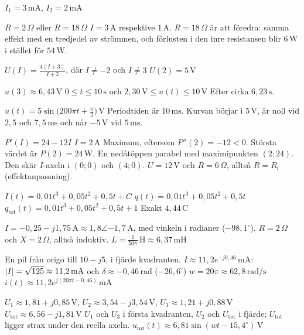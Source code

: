 
\begin{facit}

 $I_1 = 3\,\text{mA}$, $I_2 = 2\,\text{mA}$

  $R = 2\,\Omega$ eller $R = 18\,\Omega$
 $I = 3\,\text{A}$ respektive $1\,\text{A}$. $R = 18\,\Omega$ är att föredra: samma effekt
med en tredjedel av strömmen, och förlusten i den inre resistansen blir $6\,\text{W}$ i stället
för $54\,\text{W}$.

  $U(I) = \frac{4(I + 3)}{I + 2}$, där $I \neq -2$ och $I \neq 3$
 $U(2) = 5\,\text{V}$

  $u(3) \approx 6{,}43\,\text{V}$
 $0 \leq t \leq 10\,\text{s}$ och $2{,}30\,\text{V} \leq u(t) \leq 10\,\text{V}$
 Efter cirka $6{,}23\,\text{s}$.

  $u(t) = 5\sin\bigl(200\pi t + \frac{\pi}{2}\bigr)\,\text{V}$
 Periodtiden är $10\,\text{ms}$. Kurvan börjar i $5\,\text{V}$, är noll vid $2{,}5$ och
$7{,}5\,\text{ms}$ och når $-5\,\text{V}$ vid $5\,\text{ms}$.

  $P'(I) = 24 - 12I$  $I = 2\,\text{A}$
 Maximum, eftersom $P''(2) = -12 < 0$.
 Största värdet är $P(2) = 24\,\text{W}$.
 En nedåtöppen parabel med maximipunkten $(2; 24)$. Den skär $I$-axeln i $(0; 0)$ och
$(4; 0)$.
 $U = 12\,\text{V}$ och $R = 6\,\Omega$, alltså $R = R_{\text{i}}$ (effektanpassning).

  $I(t) = 0{,}01t^3 + 0{,}05t^2 + 0{,}5t + C$
 $q(t) = 0{,}01t^3 + 0{,}05t^2 + 0{,}5t$
 $q_{\text{tot}}(t) = 0{,}01t^3 + 0{,}05t^2 + 0{,}5t + 1$
 Exakt $4{,}44\,\text{C}$

  $I = -0{,}25 - j1{,}75\,\text{A} \approx 1{,}8\angle{-1{,}7}\,\text{A}$, med vinkeln
i radianer ($-98{,}1^{\circ}$).
 $R = 2\,\Omega$ och $X = 2\,\Omega$, alltså induktiv.
 $L = \frac{1}{50\pi}\,\text{H} \approx 6{,}37\,\text{mH}$

  En pil från origo till $10 - j5$, i fjärde kvadranten.
 $I \approx 11{,}2e^{-j0{,}46}\,\text{mA}$: $\lvert I\rvert = \sqrt{125} \approx 11{,}2\,\text{mA}$
och $\delta \approx -0{,}46\,\text{rad}$ ($-26{,}6^{\circ}$)
 $w = 20\pi \approx 62{,}8\,\text{rad/s}$
 $i(t) \approx 11{,}2e^{j(20\pi t - 0{,}46)}\,\text{mA}$

  $U_1 \approx 1{,}81 + j0{,}85\,\text{V}$, $U_2 \approx 3{,}54 - j3{,}54\,\text{V}$,
$U_3 \approx 1{,}21 + j0{,}88\,\text{V}$
 $U_{\text{tot}} \approx 6{,}56 - j1{,}81\,\text{V}$
 $U_1$ och $U_3$ i första kvadranten, $U_2$ och $U_{\text{tot}}$ i fjärde; $U_{\text{tot}}$
ligger strax under den reella axeln.
 $u_{\text{tot}}(t) \approx 6{,}81\sin(wt - 15{,}4^{\circ})\,\text{V}$

\end{facit}

